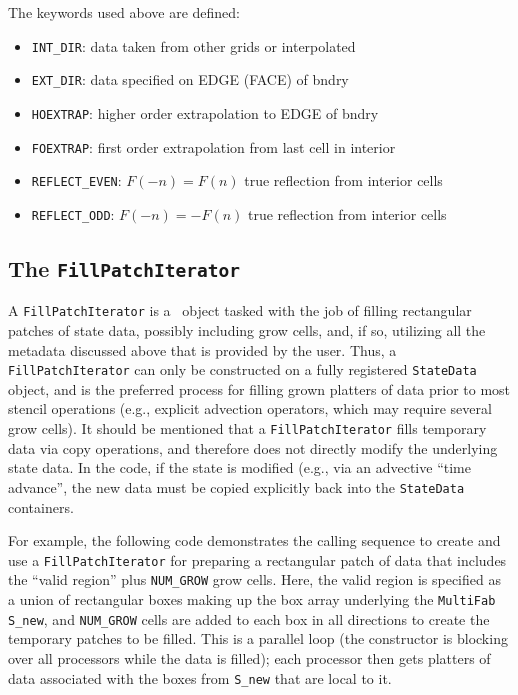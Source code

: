 The keywords used above are defined:
\begin{itemize}
\item {\tt INT\_DIR}: data taken from other grids or interpolated

\item {\tt EXT\_DIR}: data specified on EDGE (FACE) of bndry

\item {\tt HOEXTRAP}: higher order extrapolation to EDGE of bndry

\item {\tt FOEXTRAP}: first order extrapolation from last cell in interior

\item {\tt REFLECT\_EVEN}: $F(-n) = F(n)$ true reflection from interior cells

\item {\tt REFLECT\_ODD}: $F(-n) = -F(n)$ true reflection from interior cells
\end{itemize}


\subsection{The {\tt FillPatchIterator}}

A {\tt FillPatchIterator} is a \amrex\ object tasked with the job of
filling rectangular patches of state data, possibly including grow cells,
and, if so, utilizing all the metadata  discussed above that is provided by
the user.  Thus, a {\tt FillPatchIterator} can only be constructed on
a fully registered {\tt StateData} object, and is the preferred 
process for filling grown platters of data prior to most stencil 
operations (e.g., explicit advection operators, which may require 
several grow cells).  It should be mentioned that a {\tt FillPatchIterator}
fills temporary data via copy operations, and therefore does not
directly modify the underlying state data.  In the code, if the state
is modified (e.g., via an advective ``time advance'', the new data
must be copied explicitly back into the {\tt StateData} containers.

For example, the following code demonstrates the calling sequence to
create and use a {\tt FillPatchIterator} for preparing a rectangular patch of 
data that includes the ``valid region'' plus {\tt NUM\_GROW} grow cells.  Here,
the valid region is specified as a union of rectangular boxes making up the 
box array underlying the {\tt MultiFab S\_new}, and {\tt NUM\_GROW} cells are 
added to each box in all directions to create the temporary patches to
be filled.  This is a parallel loop (the constructor is blocking over all
processors while the data is filled); each processor then gets platters of data
associated with the boxes from {\tt S\_new} that are local to it.


